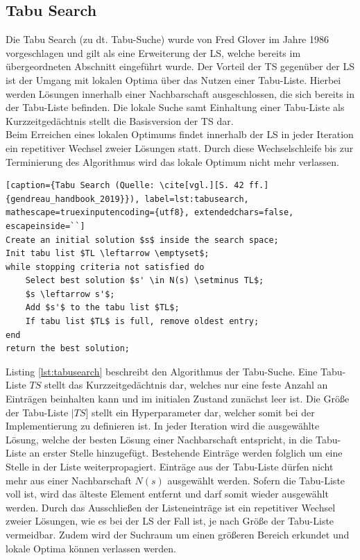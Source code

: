 \subsection{Tabu Search} \label{subsec:Grundlagen_TabuSearch}

Die Tabu Search (zu dt. Tabu-Suche) wurde von Fred Glover im Jahre 1986 vorgeschlagen \cite[vgl.][S. 37]{gendreau_handbook_2019} und gilt als eine Erweiterung der \acf{LS}, welche bereits im übergeordneten Abschnitt eingeführt wurde. Der Vorteil der \acf{TS} gegenüber der \ac{LS} ist der Umgang mit lokalen Optima über das Nutzen einer Tabu-Liste. Hierbei werden Lösungen innerhalb einer Nachbarschaft ausgeschlossen, die sich bereits in der Tabu-Liste befinden. Die lokale Suche samt Einhaltung einer Tabu-Liste als Kurzzeitgedächtnis stellt die Basisversion der \ac{TS} dar. \cite[vgl.][S. 40]{gendreau_handbook_2019} \\

Beim Erreichen eines lokalen Optimums findet innerhalb der \ac{LS} in jeder Iteration ein repetitiver Wechsel zweier Lösungen statt. Durch diese Wechselschleife bis zur Terminierung des Algorithmus wird das lokale Optimum nicht mehr verlassen. \cite[vgl.][S. 40]{gendreau_handbook_2019} 

\begin{lstlisting}[caption={Tabu Search (Quelle: \cite[vgl.][S. 42 ff.]{gendreau_handbook_2019}}), label=lst:tabusearch, mathescape=truexinputencoding={utf8}, extendedchars=false, escapeinside=``]
Create an initial solution $s$ inside the search space;
Init tabu list $TL \leftarrow \emptyset$;
while stopping criteria not satisfied do
    Select best solution $s' \in N(s) \setminus TL$;
    $s \leftarrow s'$; 
    Add $s'$ to the tabu list $TL$;
    If tabu list $TL$ is full, remove oldest entry;
end
return the best solution;
\end{lstlisting}

Listing \ref{lst:tabusearch} beschreibt den Algorithmus der Tabu-Suche. Eine Tabu-Liste $TS$ stellt das Kurzzeitgedächtnis dar, welches nur eine feste Anzahl an Einträgen beinhalten kann und im initialen Zustand zunächst leer ist. Die Größe der Tabu-Liste $|TS]$ stellt ein Hyperparameter dar, welcher somit bei der Implementierung zu definieren ist. In jeder Iteration wird die ausgewählte Lösung, welche der besten Lösung einer Nachbarschaft entspricht, in die Tabu-Liste an erster Stelle hinzugefügt. Bestehende Einträge werden folglich um eine Stelle in der Liste weiterpropagiert. Einträge aus der Tabu-Liste dürfen nicht mehr aus einer Nachbarschaft $N(s)$ ausgewählt werden. Sofern die Tabu-Liste voll ist, wird das älteste Element entfernt und darf somit wieder ausgewählt werden. Durch das Ausschließen der Listeneinträge ist ein repetitiver Wechsel zweier Lösungen, wie es bei der \ac{LS} der Fall ist, je nach Größe der Tabu-Liste vermeidbar. Zudem wird der Suchraum um einen größeren Bereich erkundet und lokale Optima können verlassen werden. \cite[vgl.][S. 42 ff.]{gendreau_handbook_2019} \\


